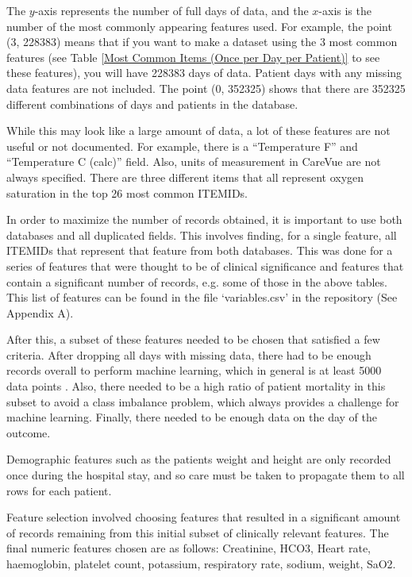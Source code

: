 \documentclass[12pt]{article}
\begin{document}
The $y$-axis represents the number of full days of data, and the $x$-axis is the number of the most commonly appearing features used. For example, the point (3, 228383) means that if you want to make a dataset using the 3 most common features (see Table \ref{Most Common Items (Once per Day per Patient)} to see these features), you will have 228383 days of data. Patient days with any missing data features are not included. The point (0, 352325) shows that there are 352325 different combinations of days and patients in the database.

While this may look like a large amount of data, a lot of these features are not useful or not documented. For example, there is a ``Temperature F'' and ``Temperature C (calc)'' field. Also, units of measurement in CareVue are not always specified. There are three different items that all represent oxygen saturation in the top 26 most common ITEMIDs. 

In order to maximize the number of records obtained, it is important to use both databases and all duplicated fields. This involves finding, for a single feature, all ITEMIDs that represent that feature from both databases. This was done for a series of features that were thought to be of clinical significance and features that contain a significant number of records, e.g. some of those in the above tables. This list of features can be found in the file `variables.csv' in the repository (See Appendix A).

After this, a subset of these features needed to be chosen that satisfied a few criteria. After dropping all days with missing data, there had to be enough records overall to perform machine learning, which in general is at least 5000 data points \cite{5000Points}. Also, there needed to be a high ratio of patient mortality in this subset to avoid a class imbalance problem, which always provides a challenge for machine learning. Finally, there needed to be enough data on the day of the outcome.

Demographic features such as the patients weight and height are only recorded once during the hospital stay, and so care must be taken to propagate them to all rows for each patient.

Feature selection involved choosing features that resulted in a significant amount of records remaining from this initial subset of clinically relevant features. The final numeric features chosen are as follows: Creatinine, HCO3, Heart rate, haemoglobin, platelet count, potassium, respiratory rate, sodium, weight, SaO2. 
\end{document}
